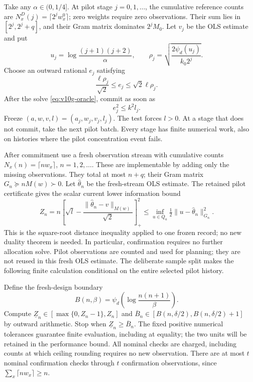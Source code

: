 \documentclass{article}
\theoremstyle{plain}
\theoremstyle{definition}
\begin{document}
Take any $\alpha\in(0,1/4]$.  At pilot stage $j=0,1,\ldots$,
the cumulative reference counts are
$N_x^D(j)=\lceil2^jw_x^0\rceil$; zero weights require zero observations.
Their sum lies in $[2^j,2^j+q]$, and their Gram matrix dominates
$2^jM_0$.  Let $v_j$ be the OLS estimate and put
\begin{equation}
 u_j=\log\frac{(j+1)(j+2)}{\alpha},\qquad
 \rho_j=\sqrt{\frac{2\psi_d(u_j)}{k_0 2^j}}.
 \label{eq:v10g-pilot-radius}
\end{equation}
Choose an outward rational $e_j$ satisfying
\[
 \frac{\ell\rho_j}{\sqrt2}\le e_j
 \le\sqrt2\ell\rho_j.
\]
After the solve \eqref{eq:v10g-oracle}, commit as soon as
\begin{equation}
 e_j^2\le k^2l_j.
 \label{eq:v10g-gate}
\end{equation}
Freeze $(a,w,v,l)=(a_j,w_j,v_j,l_j)$.  The test forces $l>0$.
At a stage that does not commit, take the next pilot batch.  Every stage
has finite numerical work, also on histories where the pilot concentration
event fails.

After commitment use a fresh observation stream with cumulative counts
$N_x(n)=\lceil nw_x\rceil$, $n=1,2,\ldots$.  These are implementable
by adding only the missing observations.  They total at most $n+q$;
their Gram matrix $G_n\succeq nM(w)\succ0$.  Let $\widehat\theta_n$
be the fresh-stream OLS estimate.  The retained pilot certificate gives
the scalar current lower information bound
\begin{equation}
 Z_n=n\left[\sqrt l-
       \frac{\|\widehat\theta_n-v\|_{M(w)}}{\sqrt2}\right]_+^2
 \le \inf_{u\in Q_a}\tfrac12\|u-\widehat\theta_n\|_{G_n}^2.
 \label{eq:v10g-recycle}
\end{equation}
This is the square-root distance inequality applied to one frozen
record; no new duality theorem is needed.  In particular, confirmation
requires no further allocation solve.  Pilot observations are counted
and used for planning; they are not reused in this fresh OLS estimate.
The deliberate sample split makes the following finite calculation
conditional on the entire selected pilot history.

Define the fresh-design boundary
\[
 B(n,\beta)=\psi_d\!\left(\log\frac{n(n+1)}\beta\right).
\]
Compute $\underline Z_n\in[\max\{0,Z_n-1\},Z_n]$ and
$\overline B_n\in[B(n,\delta/2),B(n,\delta/2)+1]$ by outward
arithmetic.  Stop when $\underline Z_n\ge\overline B_n$.
The fixed positive numerical tolerances guarantee finite evaluation,
including at equality; the two units will be retained in the performance
bound.  All nominal checks are charged, including counts at which ceiling
rounding requires no new observation.  There are at most $t$ nominal
confirmation checks through $t$ confirmation observations, since
$\sum_x\lceil nw_x\rceil\ge n$.
\end{document}
